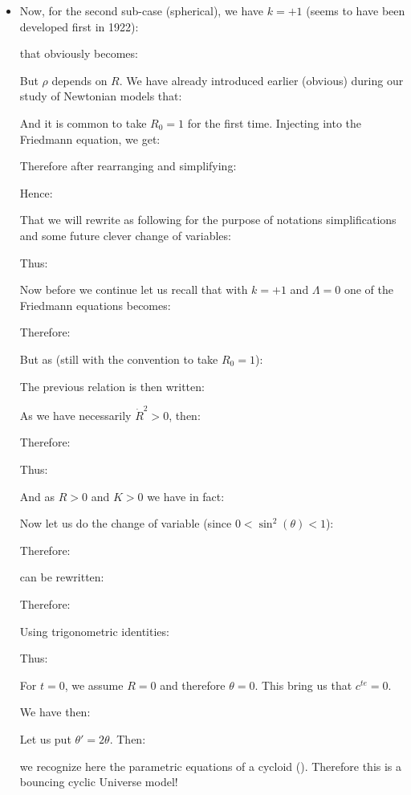 \begin{itemize}
\begin{itemize}
				\item Now, for the second sub-case (spherical), we have $k=+1$ (seems to have been developed first in 1922):
				
				that obviously becomes:
				
				But $\rho$ depends on $R$. We have already introduced earlier (obvious) during our study of Newtonian models that:
				
				And it is common to take $R_0=1$ for the first time. Injecting into the Friedmann equation, we get:
				
				Therefore after rearranging and simplifying:
				
				Hence:
				
				That we will rewrite as following for the purpose of notations simplifications and some future clever change of variables:
				
				Thus:
				
				Now before we continue let us recall that with $k=+1$ and $\Lambda=0$ one of the Friedmann equations becomes:
				
				Therefore:
				
				But as (still with the convention to take $R_0=1$):
				
				The previous relation is then written:
				
				As we have necessarily $\dot{R}^2>0$, then:
				
				Therefore:
				
				Thus:
				
				And as $R>0$ and $K>0$ we have in fact:
				
				Now let us do the change of variable (since $0<\sin^2(\theta)<1$):
				
				Therefore:
				
				can be rewritten:
				
				Therefore:
				
				Using trigonometric identities:
				
				Thus:
				
				For $t=0$, we assume $R=0$ and therefore $\theta=0$. This bring us that $c^{te}=0$.
				
				We have then:
				
				Let us put $\theta'=2\theta$. Then:
				
				we recognize here the parametric equations of a cycloid (). Therefore this is a bouncing cyclic Universe model!
				

\end{itemize}
\end{itemize}
